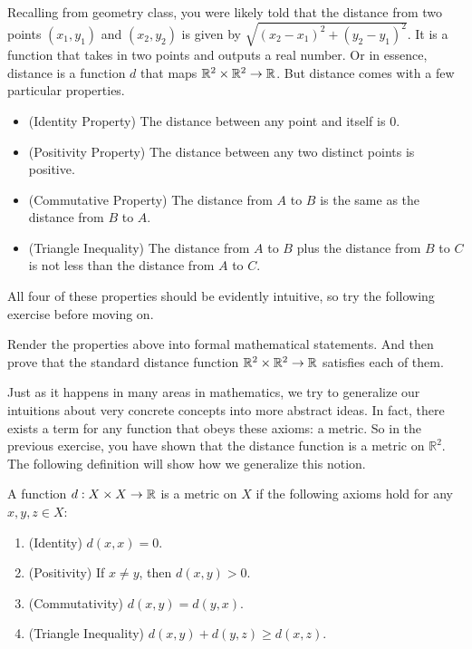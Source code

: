Recalling from geometry class, you were likely told that the distance from two points $(x_1,y_1)$ and $(x_2,y_2)$ is given by $\sqrt{(x_2-x_1)^2+(y_2-y_1)^2}$. It is a function that takes in two points and outputs a real number. Or in essence, distance is a function $d$ that maps $\mathbb{R}^2\times\mathbb{R}^2\to\mathbb{R}$. But distance comes with a few particular properties. 

\begin{itemize}
    \item (Identity Property) The distance between any point and itself is $0$.
    \item (Positivity Property) The distance between any two distinct points is positive. 
    \item (Commutative Property) The distance from $A$ to $B$ is the same as the distance from $B$ to $A$.
    \item (Triangle Inequality) The distance from $A$ to $B$ plus the distance from $B$ to $C$ is not less than the distance from $A$ to $C$.
\end{itemize}

All four of these properties should be evidently intuitive, so try the following exercise before moving on.\par\newline

\begin{exercise}
    Render the properties above into formal mathematical statements. And then prove that the standard distance function $\mathbb{R}^2\times\mathbb{R}^2\to\mathbb{R}$ satisfies each of them.
\end{exercise}

Just as it happens in many areas in mathematics, we try to generalize our intuitions about very concrete concepts into more abstract ideas. In fact, there exists a term for any function that obeys these axioms: a metric. So in the previous exercise, you have shown that the distance function is a metric on $\mathbb{R}^2$. The following definition will show how we generalize this notion.\par

\begin{definition}[A Metric on $X$]
    A function $d: X\times X \to \mathbb{R}$ is a metric on $X$ if the following axioms hold for any $x,y,z\in X$:
    \begin{enumerate}
        \item (Identity) $d(x,x)=0$. 
        \item (Positivity) If $x\neq y$, then $d(x,y)>0$. 
        \item (Commutativity) $d(x,y)=d(y,x)$. 
        \item (Triangle Inequality) $d(x,y)+d(y,z)\geq d(x,z)$. 
    \end{enumerate}
\end{definition}
\vspace{3mm}

